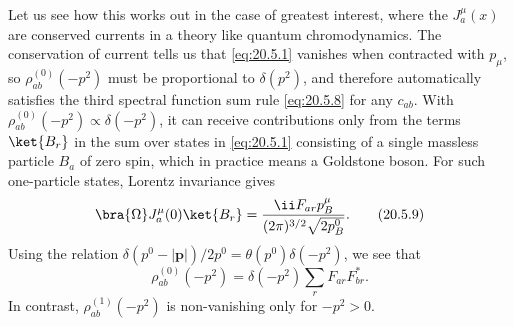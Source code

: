 Let us see how this works out in the case of greatest interest, where the $J_a^\mu(x)$ are conserved currents in a theory like quantum chromodynamics. The conservation of current tells us that \eqref{eq:20.5.1} vanishes when contracted with $p_\mu$, so $\rho_{ab}^{(0)}(-p^2)$ must be proportional to $\delta(p^2)$, and therefore automatically satisfies the third spectral function sum rule \eqref{eq:20.5.8} for any $c_{ab}$. With $\rho_{ab}^{(0)}(-p^2)\propto\delta(-p^2)$, it can receive contributions only from the terms $\ket{B_r}$ in the sum over states in \eqref{eq:20.5.1} consisting of a single massless particle $B_a$ of zero spin, which in practice means a Goldstone boson. For such one-particle states, Lorentz invariance gives
\begin{equation}
\bra{\Omega}J_a^\mu(0)\ket{B_r}
=\frac{\ii F_{a r}p_B^\mu}{(2\pi)^{3/2}\sqrt{2p_B^0}}.
\tag{20.5.9}\label{eq:20.5.9}
\end{equation}
Using the relation $\delta(p^0-|\mathbf p|)/2p^0=\theta(p^0)\delta(-p^2)$, we see that
\begin{equation}
\rho_{ab}^{(0)}(-p^2)
=\delta(-p^2)\sum_r F_{a r}F_{b r}^*.
\tag{20.5.10}\label{eq:20.5.10}
\end{equation}
In contrast, $\rho_{ab}^{(1)}(-p^2)$ is non-vanishing only for $-p^2>0$.

